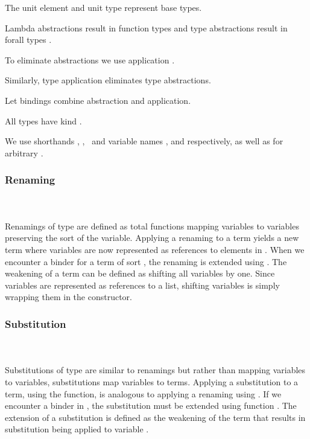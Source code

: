 \noindent The unit element  and unit type  represent base types. 

\noindent Lambda abstractions   result in function types    and type abstractions   result in forall types  . 

\noindent To eliminate abstractions we use application   .

\noindent Similarly, type application    eliminates type abstractions. 

\noindent Let bindings     combine abstraction and application. 

\noindent All types  have kind .

\noindent We use shorthands \FVar, \FExpr, \FType\ and variable names ,  and  respectively, as well as  for arbitrary   .

\subsubsection{Renaming}\hfill\\\\
Renamings  of type    are defined as total functions mapping variables    to variables    preserving the sort  of the variable.
\FRen
Applying a renaming    to a term    yields a new term    where variables are now represented as references to elements in .
\Fren
When we encounter a binder for a term of sort , the renaming is extended using \Frenext. 
The weakening of a term can be defined as shifting all variables by one.
\Fwk 
Since variables are represented as references to a list, shifting variables is simply wrapping them in the  constructor.

\subsubsection{Substitution}\hfill\\\\
Substitutions  of type    are similar to renamings but rather than mapping variables to variables, substitutions map variables to terms.
\FSub
Applying a substitution to a term, using the  function, is analogous to applying a renaming using . If we encounter a binder in , the substitution must be extended using function .
\Fext
The extension of a substitution is defined as the weakening of the term that results in substitution being applied to variable .

